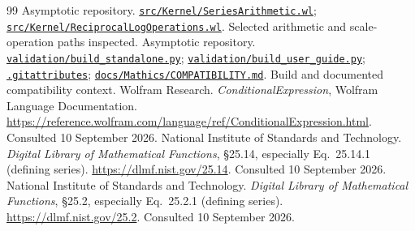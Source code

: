 \documentclass[11pt,a4paper]{article}
\newcommand{\repo}[1]{\href{https://github.com/VladimirReshetnikov/Asymptotic/blob/8cee870994f506b501bae3ea6bd4a3a7edb895c1/#1}{\nolinkurl{#1}}}
\newcommand{\kernel}[1]{\repo{src/Kernel/#1}}
\begin{document}
\begin{thebibliography}{99}
 Asymptotic repository. \kernel{SeriesArithmetic.wl}; \kernel{ReciprocalLogOperations.wl}. Selected arithmetic and scale-operation paths inspected.
 Asymptotic repository. \repo{validation/build_standalone.py}; \repo{validation/build_user_guide.py}; \repo{.gitattributes}; \repo{docs/Mathics/COMPATIBILITY.md}. Build and documented compatibility context.
 Wolfram Research. \emph{ConditionalExpression}, Wolfram Language Documentation. \url{https://reference.wolfram.com/language/ref/ConditionalExpression.html}. Consulted 10 September 2026.
 National Institute of Standards and Technology. \emph{Digital Library of Mathematical Functions}, \S25.14, especially Eq.~25.14.1 (defining series). \url{https://dlmf.nist.gov/25.14}. Consulted 10 September 2026.
 National Institute of Standards and Technology. \emph{Digital Library of Mathematical Functions}, \S25.2, especially Eq.~25.2.1 (defining series). \url{https://dlmf.nist.gov/25.2}. Consulted 10 September 2026.
\end{thebibliography}
\endgroup
\end{document}
